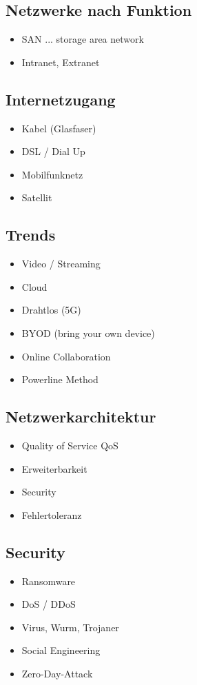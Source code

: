 \subsection*{Netzwerke nach Funktion}
\begin{itemize}
	\item SAN ... storage area network
	\item Intranet, Extranet
\end{itemize}

\subsection*{Internetzugang}
\begin{itemize}
	\item Kabel (Glasfaser)
	\item DSL / Dial Up
	\item Mobilfunknetz
	\item Satellit
\end{itemize}

\subsection*{Trends}
\begin{itemize}
	\item Video / Streaming
	\item Cloud
	\item Drahtlos (5G)
	\item BYOD (bring your own device)
	\item Online Collaboration
	\item Powerline Method
\end{itemize}

\subsection*{Netzwerkarchitektur}
\begin{itemize}
	\item Quality of Service QoS
	\item Erweiterbarkeit
	\item Security
	\item Fehlertoleranz
\end{itemize}

\subsection*{Security}
\begin{itemize}
	\item Ransomware
	\item DoS / DDoS
	\item Virus, Wurm, Trojaner
	\item Social Engineering
	\item Zero-Day-Attack
\end{itemize}

